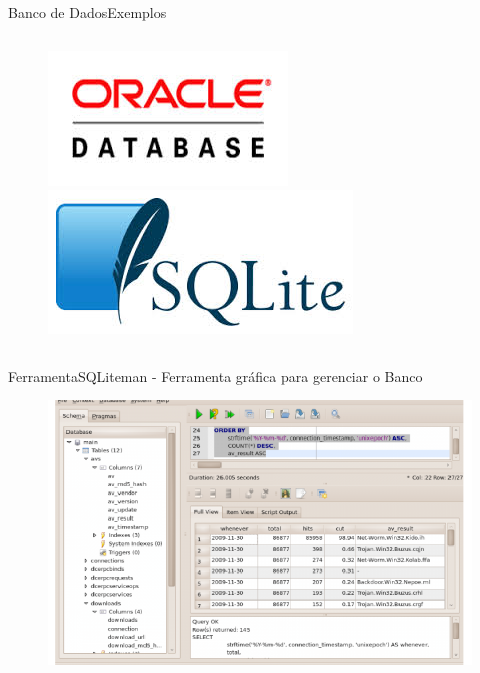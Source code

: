 \documentclass{beamer}
\begin{document}
\begin{frame}[fragile]{Banco de Dados}{Exemplos}
\begin{columns}
		\begin{column}{0.5\textwidth}
			\begin{figure}
				\begin{minipage}{\columnwidth}
					\includegraphics[scale=0.7]{images/oracle}
				\end{minipage}
				\begin{minipage}{\columnwidth}
					\includegraphics[scale=0.5]{images/sqlite}
				\end{minipage}
			\end{figure}
		\end{column}
	\end{columns}		
\end{frame}


\begin{frame}[fragile]{Ferramenta}{SQLiteman - Ferramenta gráfica para gerenciar o Banco}
	\begin{figure}
		\begin{minipage}{\columnwidth}
			\centering
				\includegraphics[scale=0.4]{images/sqliteman}
		\end{minipage}
	\end{figure}
\end{frame}
\end{document}
